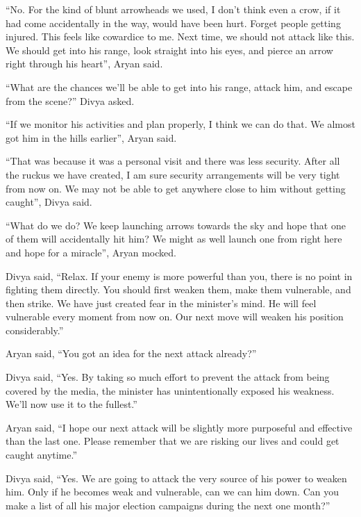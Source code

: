 “No. For the kind of blunt arrowheads we used, I don't think even a crow, if
it had come accidentally in the way, would have been hurt. Forget people getting
injured. This feels like cowardice to me. Next time, we should not attack like
this. We should get into his range, look straight into his eyes, and pierce an
arrow right through his heart”, Aryan said.

“What are the chances we'll be able to get into his range, attack him, and escape
from the scene?” Divya asked.

“If we monitor his activities and plan properly, I think we can do that. We
almost got him in the hills earlier”, Aryan said.

“That was because it was a personal visit and there was less security. After all
the ruckus we have created, I am sure security arrangements will be very tight
from now on. We may not be able to get anywhere close to him without getting
caught”, Divya said.

“What do we do? We keep launching arrows towards the sky and hope that one of
them will accidentally hit him? We might as well launch one from right here and
hope for a miracle”, Aryan mocked.

Divya said, “Relax. If your enemy is more powerful than you, there is no point
in fighting them directly. You should first weaken them, make them vulnerable,
and then strike. We have just created fear in the minister's mind. He will
feel vulnerable every moment from now on. Our next move will weaken his position
considerably.”

Aryan said, “You got an idea for the next attack already?”

Divya said, “Yes. By taking so much effort to prevent the attack from being
covered by the media, the minister has unintentionally exposed his weakness.
We'll now use it to the fullest.”

Aryan said, “I hope our next attack will be slightly more purposeful and
effective than the last one. Please remember that we are risking our lives and
could get caught anytime.”

Divya said, “Yes. We are going to attack the very source of his power to weaken
him. Only if he becomes weak and vulnerable, can we can him down. Can you make
a list of all his major election campaigns during the next one month?”